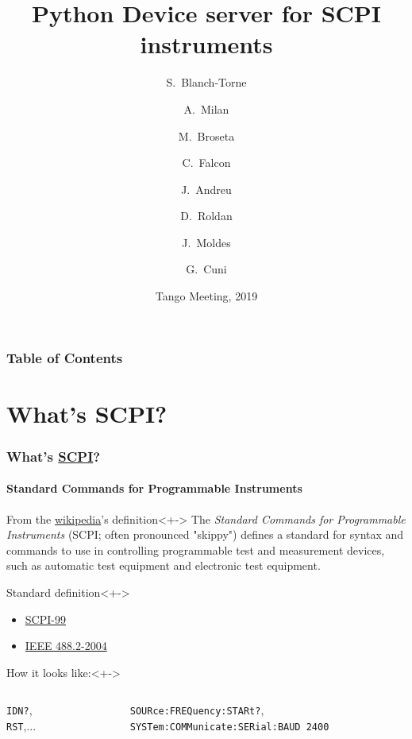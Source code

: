 \documentclass{beamer}
\title[Skippy]
  {Python Device server for SCPI instruments}
\author[Sergi Blanch-Torn\'e] %
{S.~Blanch-Torne\inst{1} \and A.~Milan\inst{2} \and M.~Broseta\inst{1} \and C.~Falcon\inst{1} \and J.~Andreu\inst{1} \and D.~Roldan\inst{1} \and J.~Moldes\inst{1} \and G.~Cuni\inst{1}}
\institute[ALBA Synchrotron] %
{
  \inst{1}%
  ALBA Synchrotron, CELLS\\
  Cerdanyola del Vall\'es
  \and
  \inst{2}%
  MAX IV Laboratory\\
  Lund
}
\date[Hamburg 2019] %
{Tango Meeting, 2019}
\begin{document}
\frame{\titlepage}

\begin{frame}
\frametitle{Table of Contents}
\tableofcontents%
\end{frame}

% 

\section{What's SCPI?}

\begin{frame}
  \frametitle{What's \href{https://en.wikipedia.org/wiki/Standard_Commands_for_Programmable_Instruments}{SCPI}?}
  \framesubtitle{Standard Commands for Programmable Instruments}
  \begin{block}{From the \href{https://en.wikipedia.org/wiki/Standard_Commands_for_Programmable_Instruments}{wikipedia}'s definition}<+->
    The \emph{Standard Commands for Programmable Instruments} (SCPI; often pronounced "skippy") defines a standard for syntax and commands to use in controlling programmable test and measurement devices, such as automatic test equipment and electronic test equipment.
  \end{block}
  \begin{alertblock}{Standard definition}<+->
    \begin{itemize}
      \item \textcolor{AlbaBlue}{\href{http://www.ivifoundation.org/docs/scpi-99.pdf}{SCPI-99}}
      \item \textcolor{AlbaBlue}{\href{http://dx.doi.org/10.1109/IEEESTD.2004.95390}{IEEE 488.2-2004}}
    \end{itemize}
  \end{alertblock}
  \begin{exampleblock}{How it looks like:}<+->
    \begin{columns}
      \begin{column}{0.18\textwidth}
        {\tt *IDN?},\\
        {\tt *RST},...
      \end{column}
      \begin{column}{0.60\textwidth}
	\textcolor{AlbaBlue}{{\tt SOURce:FREQuency:STARt?}, \\{\tt SYSTem:COMMunicate:SERial:BAUD 2400}}
      \end{column}
    \end{columns}
  \end{exampleblock}
\end{frame}
  
\end{document}
